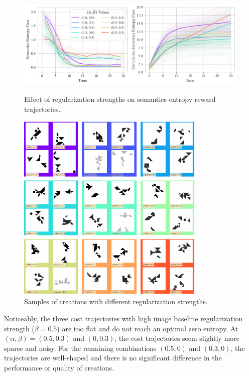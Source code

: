 \begin{figure}[H]
    \centering
    \includegraphics[width=\textwidth]{images/alpha_beta_comparison_rair.pdf}
    \caption{Effect of regularization strengths on semantics entropy reward trajectories.}
    \label{fig:alpha-beta-trajectories}
    \vspace{12pt}
    \includegraphics[width=0.8\textwidth]{images/alpha_beta_rair_samples.pdf}
    \caption{Samples of creations with different regularization strengths.}
    \label{fig:alpha-beta-samples}
\end{figure}
\vspace{-11pt}

Noticeably, the three cost trajectories with high image baseline regularization strength (\(\beta = 0.5\)) are too flat and do not reach an optimal zero entropy.
At \((\alpha, \beta) = (0.5, 0.3)\) and \((0, 0.3)\), the cost trajectories seem slightly more sparse and noisy.
For the remaining combinations \((0.5, 0)\) and \((0.3, 0)\), the trajectories are well-shaped and there is no significant difference in the performance or quality of creations.

